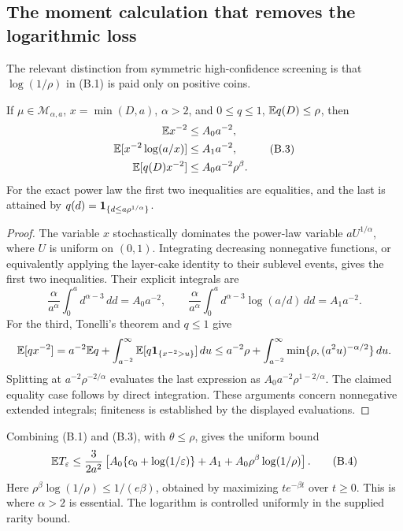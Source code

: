 \subsection{The moment calculation that removes the logarithmic loss}
The relevant distinction from symmetric high-confidence screening is that
$\log(1/\rho)$ in (B.1) is paid only on positive coins.

\begin{lemma}\label{above:lem:integration}
If $\mu\in\mathcal M_{\alpha,a}$, $x=\min(D,a)$, $\alpha>2$, and
$0\le q\le1$, $\mathbb E q(D)\le\rho$, then
\[
\begin{aligned}
 \mathbb E x^{-2}&\le A_0a^{-2},\\
 \mathbb E[x^{-2}\log(a/x)]&\le A_1a^{-2},\\
 \mathbb E[q(D)x^{-2}]&\le A_0a^{-2}\rho^\beta.
\end{aligned}                                           \tag{B.3}
\]
For the exact power law the first two inequalities are equalities, and the
last is attained by $q(d)=\mathbf 1_{\{d\le a\rho^{1/\alpha}\}}$.
\end{lemma}
\begin{proof}
The variable $x$ stochastically dominates the power-law variable $aU^{1/\alpha}$,
where $U$ is uniform on $(0,1)$. Integrating decreasing nonnegative functions,
or equivalently applying the layer-cake identity to their sublevel events,
gives the first two inequalities. Their explicit integrals are
\[
 \frac\alpha{a^\alpha}\int_0^a d^{\alpha-3}\,dd=A_0a^{-2},
 \qquad
 \frac\alpha{a^\alpha}\int_0^a d^{\alpha-3}\log(a/d)\,dd=A_1a^{-2}.
\]
For the third, Tonelli's theorem and $q\le1$ give
\[
 \mathbb E[qx^{-2}]
 =a^{-2}\mathbb E q+\int_{a^{-2}}^\infty\mathbb E[q\mathbf 1_{\{x^{-2}>u\}}]\,du
 \le a^{-2}\rho+\int_{a^{-2}}^\infty
                  \min\{\rho,(a^2u)^{-\alpha/2}\}\,du.
\]
Splitting at $a^{-2}\rho^{-2/\alpha}$ evaluates the last expression as
$A_0a^{-2}\rho^{1-2/\alpha}$. The claimed equality case follows by direct
integration. These arguments concern nonnegative extended integrals;
finiteness is established by the displayed evaluations.
\end{proof}

Combining (B.1) and (B.3), with $\theta\le\rho$, gives the uniform bound
\[
 \mathbb E T_\varepsilon\le\frac{3}{2a^2}
 \left[A_0\{c_0+\log(1/\varepsilon)\}+A_1
                  +A_0\rho^\beta\log(1/\rho)\right].     \tag{B.4}
\]
Here $\rho^\beta\log(1/\rho)\le1/(e\beta)$, obtained by maximizing
$te^{-\beta t}$ over $t\ge0$. This is where $\alpha>2$ is essential.
The logarithm is controlled uniformly in the supplied rarity bound.

